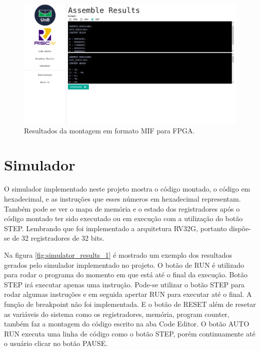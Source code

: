 	\begin{figure}[h]
	  \includegraphics[width=\linewidth]{img/assemble_data_mif.png}
	  \caption{Resultados da montagem em formato MIF para FPGA.}
	  \label{fig:assemble_data_mif}
	\end{figure}



\section{Simulador}

	O simulador implementado neste projeto mostra o código montado, o código em hexadecimal, e as instruções que esses números em hexadecimal representam. Também pode se ver o mapa de memória e o estado dos registradores após o código montado ter sido executado ou em execução com a utilização do botão STEP.  Lembrando que foi implementado a arquitetura RV32G, portanto dispõe-se de 32 registradores de 32 bits.

	Na figura \ref{fig:simulator_results_1} é mostrado um exemplo dos resultados gerados pelo simulador implementado no projeto. O botão de RUN é utilizado para rodar o programa do momento em que está até o final da execução. Botão STEP irá executar apenas uma instrução. Pode-se utilizar o botão STEP para rodar algumas instruções e em seguida apertar RUN para executar até o final. A função de breakpoint não foi implementada. E o botão de RESET além de resetar as variáveis do sistema como os registradores, memória, program counter, também faz a montagem do código escrito na aba Code Editor. O botão AUTO RUN executa uma linha de código como o botão STEP, porém continuamente até o usuário clicar no botão PAUSE.

